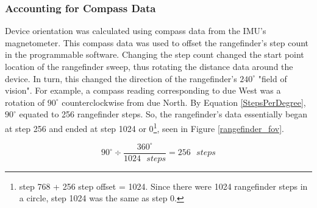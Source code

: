 \subsubsection{Accounting for Compass Data}
Device orientation was calculated using compass data from the IMU's magnetometer. This compass data was used to offset the rangefinder's step count in the programmable software. Changing the step count changed the start point location of the rangefinder sweep, thus rotating the distance data around the device. In turn, this changed the direction of the rangefinder's $240^\circ$ "field of vision". For example, a compass reading corresponding to due West was a rotation of $90^\circ$ counterclockwise from due North. By Equation \ref{StepsPerDegree}, $90^\circ$ equated to 256 rangefinder steps. So, the rangefinder's data essentially began at step 256 and ended at step 1024 or 0\footnote{step 768 + 256 step offset = 1024. Since there were 1024 rangefinder steps in a circle, step 1024 was the same as step 0.}, seen in Figure \ref{rangefinder_fov}.

\begin{equation}
	90^\circ \div \dfrac{360^\circ}{1024 \textrm{ } steps}  = 256 \textrm{ } steps
	\label{StepsPerDegree}
\end{equation}



